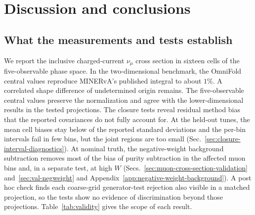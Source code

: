 \section{Discussion and conclusions}
\label{sec:discussion-and-conclusions}

\subsection{What the measurements and tests establish}
\label{sec:result-validity}

We report the inclusive charged-current $\nu_\mu$ cross section in sixteen cells of the five-observable phase space. In the two-dimensional benchmark, the OmniFold central values reproduce MINERvA's published integral to about $1\%$. A correlated shape difference of undetermined origin remains. The five-observable central values preserve the normalization and agree with the lower-dimensional results in the tested projections. The closure tests reveal residual method bias that the reported covariances do not fully account for. At the held-out tunes, the mean cell biases stay below  of the reported standard deviations and the per-bin intervals fail in few bins, but the joint regions are too small (Sec.~\ref{sec:closure-interval-diagnostics}). At nominal truth, the negative-weight background subtraction removes most of the bias of purity subtraction in the affected muon bins and, in a separate test, at high $W$ (Secs.~\ref{sec:muon-cross-section-validation} and~\ref{sec:val-negweight} and Appendix~\ref{app:negative-weight-background}). A post hoc check finds each coarse-grid generator-test rejection also visible in a matched projection, so the tests show no evidence of discrimination beyond those projections. Table~\ref{tab:validity} gives the scope of each result.

